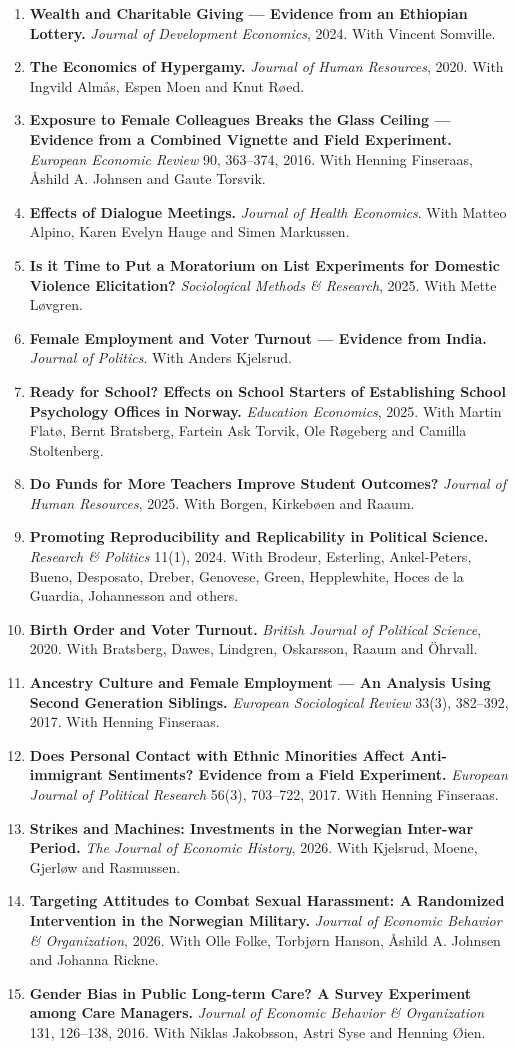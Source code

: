 \documentclass[11pt]{article}
\newcommand{\pub}[2]{\item \textbf{#1} #2}
\begin{document}
\begin{enumerate}
\pub{Wealth and Charitable Giving --- Evidence from an Ethiopian Lottery.}{\textit{Journal of Development Economics}, 2024. With Vincent Somville.}
\pub{The Economics of Hypergamy.}{\textit{Journal of Human Resources}, 2020. With Ingvild Almås, Espen Moen and Knut Røed.}
\pub{Exposure to Female Colleagues Breaks the Glass Ceiling --- Evidence from a Combined Vignette and Field Experiment.}{\textit{European Economic Review} 90, 363--374, 2016. With Henning Finseraas, Åshild A. Johnsen and Gaute Torsvik.}
\pub{Effects of Dialogue Meetings.}{\textit{Journal of Health Economics}. With Matteo Alpino, Karen Evelyn Hauge and Simen Markussen.}
\pub{Is it Time to Put a Moratorium on List Experiments for Domestic Violence Elicitation?}{\textit{Sociological Methods \& Research}, 2025. With Mette Løvgren.}
\pub{Female Employment and Voter Turnout --- Evidence from India.}{\textit{Journal of Politics}. With Anders Kjelsrud.}
\pub{Ready for School? Effects on School Starters of Establishing School Psychology Offices in Norway.}{\textit{Education Economics}, 2025. With Martin Flatø, Bernt Bratsberg, Fartein Ask Torvik, Ole Røgeberg and Camilla Stoltenberg.}
\pub{Do Funds for More Teachers Improve Student Outcomes?}{\textit{Journal of Human Resources}, 2025. With Borgen, Kirkebøen and Raaum.}
\pub{Promoting Reproducibility and Replicability in Political Science.}{\textit{Research \& Politics} 11(1), 2024. With Brodeur, Esterling, Ankel-Peters, Bueno, Desposato, Dreber, Genovese, Green, Hepplewhite, Hoces de la Guardia, Johannesson and others.}
\pub{Birth Order and Voter Turnout.}{\textit{British Journal of Political Science}, 2020. With Bratsberg, Dawes, Lindgren, Oskarsson, Raaum and Öhrvall.}
\pub{Ancestry Culture and Female Employment --- An Analysis Using Second Generation Siblings.}{\textit{European Sociological Review} 33(3), 382--392, 2017. With Henning Finseraas.}
\pub{Does Personal Contact with Ethnic Minorities Affect Anti-immigrant Sentiments? Evidence from a Field Experiment.}{\textit{European Journal of Political Research} 56(3), 703--722, 2017. With Henning Finseraas.}
\pub{Strikes and Machines: Investments in the Norwegian Inter-war Period.}{\textit{The Journal of Economic History}, 2026. With Kjelsrud, Moene, Gjerløw and Rasmussen.}
\pub{Targeting Attitudes to Combat Sexual Harassment: A Randomized Intervention in the Norwegian Military.}{\textit{Journal of Economic Behavior \& Organization}, 2026. With Olle Folke, Torbjørn Hanson, Åshild A. Johnsen and Johanna Rickne.}
\pub{Gender Bias in Public Long-term Care? A Survey Experiment among Care Managers.}{\textit{Journal of Economic Behavior \& Organization} 131, 126--138, 2016. With Niklas Jakobsson, Astri Syse and Henning Øien.}

\end{enumerate}
\end{document}
